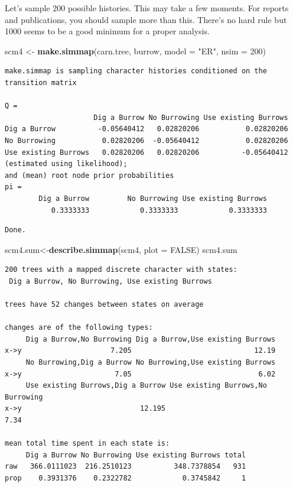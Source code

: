 \documentclass[
]{book}
\newenvironment{Shaded}{\begin{snugshade}}{\end{snugshade}}
\newcommand{\DataTypeTok}[1]{\textcolor[rgb]{0.13,0.29,0.53}{#1}}
\newcommand{\DecValTok}[1]{\textcolor[rgb]{0.00,0.00,0.81}{#1}}
\newcommand{\KeywordTok}[1]{\textcolor[rgb]{0.13,0.29,0.53}{\textbf{#1}}}
\newcommand{\NormalTok}[1]{#1}
\newcommand{\OtherTok}[1]{\textcolor[rgb]{0.56,0.35,0.01}{#1}}
\newcommand{\StringTok}[1]{\textcolor[rgb]{0.31,0.60,0.02}{#1}}
\begin{document}
Let's sample 200 possible histories. This may take a few moments. For reports and publications, you should sample more than this. There's no hard rule but 1000 seems to be a good minimum for a proper analysis.

\begin{Shaded}
\begin{Highlighting}[]
\NormalTok{scm4 \textless{}{-}}\StringTok{ }\KeywordTok{make.simmap}\NormalTok{(carn.tree, burrow, }\DataTypeTok{model =} \StringTok{"ER"}\NormalTok{, }\DataTypeTok{nsim =} \DecValTok{200}\NormalTok{)}
\end{Highlighting}
\end{Shaded}

\begin{verbatim}
make.simmap is sampling character histories conditioned on the transition matrix

Q =
                     Dig a Burrow No Burrowing Use existing Burrows
Dig a Burrow          -0.05640412   0.02820206           0.02820206
No Burrowing           0.02820206  -0.05640412           0.02820206
Use existing Burrows   0.02820206   0.02820206          -0.05640412
(estimated using likelihood);
and (mean) root node prior probabilities
pi =
        Dig a Burrow         No Burrowing Use existing Burrows 
           0.3333333            0.3333333            0.3333333 
\end{verbatim}

\begin{verbatim}
Done.
\end{verbatim}

\begin{Shaded}
\begin{Highlighting}[]
\NormalTok{scm4.sum\textless{}{-}}\KeywordTok{describe.simmap}\NormalTok{(scm4, }\DataTypeTok{plot =} \OtherTok{FALSE}\NormalTok{)}
\NormalTok{scm4.sum}
\end{Highlighting}
\end{Shaded}

\begin{verbatim}
200 trees with a mapped discrete character with states:
 Dig a Burrow, No Burrowing, Use existing Burrows 

trees have 52 changes between states on average

changes are of the following types:
     Dig a Burrow,No Burrowing Dig a Burrow,Use existing Burrows
x->y                     7.205                             12.19
     No Burrowing,Dig a Burrow No Burrowing,Use existing Burrows
x->y                      7.05                              6.02
     Use existing Burrows,Dig a Burrow Use existing Burrows,No Burrowing
x->y                            12.195                              7.34

mean total time spent in each state is:
     Dig a Burrow No Burrowing Use existing Burrows total
raw   366.0111023  216.2510123          348.7378854   931
prop    0.3931376    0.2322782            0.3745842     1
\end{verbatim}
\end{document}
